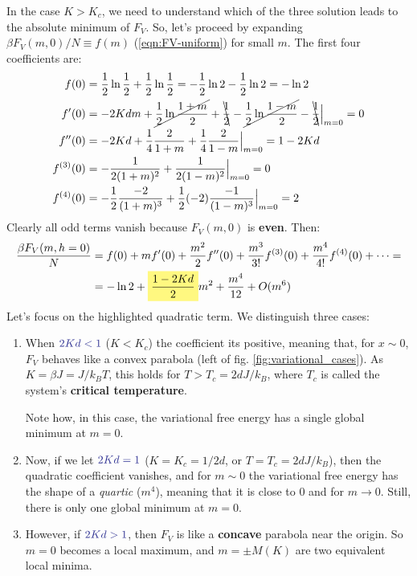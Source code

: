\documentclass[../../main.tex]{subfiles}
\begin{document}
In the case $K > K_c$, we need to understand which of the three solution leads to the absolute minimum of $F_V$. So, let's proceed by expanding $\beta F_V(m,0)/N \equiv f(m)$ (\ref{eqn:FV-uniform}) for small $m$. The first four coefficients are:
\begin{align*}
    f(0) &= \frac{1}{2} \ln \frac{1}{2} + \frac{1}{2} \ln \frac{1}{2} = -\frac{1}{2} \ln 2 - \frac{1}{2}\ln 2 = -\ln 2\\
    f'(0) &= -2 K d m + \cancel{\frac{1}{2}\ln \frac{1+m}{2}} + \bcancel{\frac{1}{2}} -\cancel{\frac{1}{2}\ln \frac{1-m}{2}} -\bcancel{\frac{1}{2}} \Big|_{m=0} = 0\\
    f''(0) &= -2Kd +\frac{1}{4}\frac{2}{1+m} +\frac{1}{4}\frac{2}{1-m}\Big|_{m=0} = 1-2Kd    \\
    f^{(3)}(0) &= -\frac{1}{2(1+m)^2} + \frac{1}{2(1-m)^2} \Big|_{m=0} = 0  \\
    f^{(4)}(0) &= -\frac{1}{2}\frac{-2}{(1+m)^3} + \frac{1}{2}(-2)\frac{-1}{(1-m)^3} \Big|_{m=0} = 2    
\end{align*}
Clearly all odd terms vanish because $F_V(m,0)$ is \textbf{even}. Then: 
\begin{align}\nonumber
    \frac{\beta F_V(m, h=0)}{N} &= f(0) + mf'(0) + \frac{m^2}{2}f''(0) + \frac{m^3}{3!}f^{(3)}(0) + \frac{m^4}{4!}f^{(4)}(0) + \dots =\\
    &= -\ln 2 +\hlc{Yellow}{\frac{1-2Kd}{2}} m^2  + \frac{m^4}{12} + O(m^6) \label{eqn:free-energy-expansion-h0}
\end{align}
Let's focus on the highlighted quadratic term. We distinguish three cases:

\begin{enumerate}
    \item When $\textcolor{Blue}{2Kd < 1}$ ($K < K_c$) the coefficient its positive, meaning that, for $x \sim 0$, $F_V$ behaves like a convex parabola (left of fig. \ref{fig:variational_cases}). As $K = \beta J = J/k_B T$, this holds for $T > T_c = 2d J/k_B$, where $T_c$ is called the system's \textbf{critical temperature}. 

    Note how, in this case, the variational free energy has a single global minimum at $m=0$.
    \item Now, if we let $\textcolor{Blue}{2Kd = 1}$ ($K=K_c = 1/2d$, or $T=T_c = 2dJ/k_B$), then the quadratic coefficient vanishes, and for $m \sim 0$ the variational free energy has the shape of a \textit{quartic} ($m^4$), meaning that it is close to $0$ and  for $m \to 0$. Still, there is only one global minimum at $m=0$.
    \item However, if $\textcolor{Blue}{2Kd > 1}$, then $F_V$ is like a \textbf{concave} parabola near the origin. So $m=0$ becomes a local maximum, and $m = \pm M(K)$ are two equivalent local minima. 
\end{enumerate}
\end{document}
